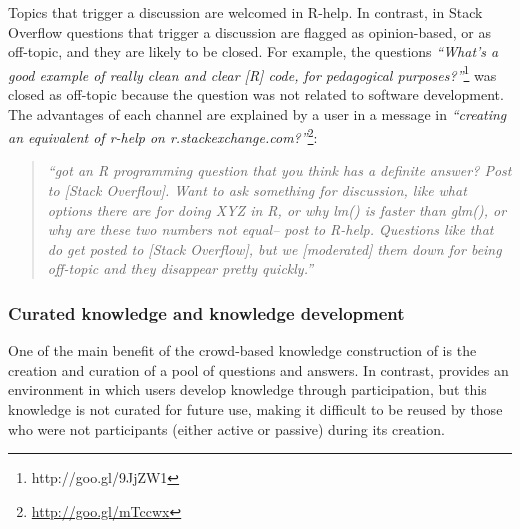 Topics that trigger a discussion are welcomed in R-help. 
In contrast, in Stack Overflow questions that trigger a discussion are flagged as opinion-based, or as off-topic, and they are likely to be closed. 
For example, the questions \textit{``What's a good example of really clean and clear [R] code, for pedagogical purposes?''}\footnote{http://goo.gl/9JjZW1} was
closed as off-topic because the question was not related to software development. 
The advantages of each channel are explained by a user in a message in \RH \emph{``creating an equivalent of r-help on r.stackexchange.com?''}\footnote{\url{http://goo.gl/mTccwx}}:
    \begin{quote}
        \textit{``got an R programming question that you think has a definite answer? Post to [Stack Overflow]. Want to ask something for discussion, like what options there are for doing XYZ in R, or why lm() is faster than glm(), or why are these two numbers not equal-- post to R-help. Questions like that do get posted to [Stack Overflow], but we [moderated] them down for being off-topic and they disappear pretty quickly.''}
    \end{quote}


\subsubsection{Curated knowledge and knowledge development}

One of the main benefit of the crowd-based knowledge construction of \SO is the creation and curation of a pool of questions and answers. In contrast, \RH provides an environment in which users
    develop knowledge through participation, but this knowledge is not curated for future use, making it difficult to be reused by those who were not
    participants (either active or passive) during its creation.


